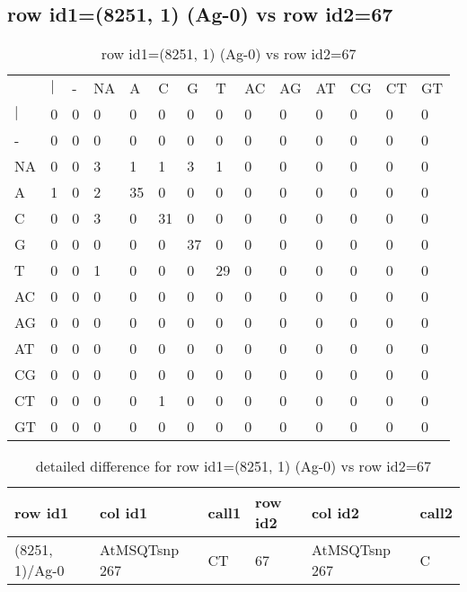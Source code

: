 \subsection{row id1=(8251, 1) (Ag-0) vs row id2=67}
\begin{center}
\begin{longtable}{|l|l|l|l|l|l|l|l|l|l|l|l|l|l|}
\caption{row id1=(8251, 1) (Ag-0) vs row id2=67} \label{table_dm190}\\
\hline
\\
\hline
&$|$&-&NA&A&C&G&T&AC&AG&AT&CG&CT&GT\\
$|$&0&0&0&0&0&0&0&0&0&0&0&0&0\\
-&0&0&0&0&0&0&0&0&0&0&0&0&0\\
NA&0&0&3&1&1&3&1&0&0&0&0&0&0\\
A&1&0&2&35&0&0&0&0&0&0&0&0&0\\
C&0&0&3&0&31&0&0&0&0&0&0&0&0\\
G&0&0&0&0&0&37&0&0&0&0&0&0&0\\
T&0&0&1&0&0&0&29&0&0&0&0&0&0\\
AC&0&0&0&0&0&0&0&0&0&0&0&0&0\\
AG&0&0&0&0&0&0&0&0&0&0&0&0&0\\
AT&0&0&0&0&0&0&0&0&0&0&0&0&0\\
CG&0&0&0&0&0&0&0&0&0&0&0&0&0\\
CT&0&0&0&0&1&0&0&0&0&0&0&0&0\\
GT&0&0&0&0&0&0&0&0&0&0&0&0&0\\
\hline
\end{longtable}
\end{center}

\begin{center}
\begin{longtable}{|l|l|l|l|l|l|}
\caption{detailed difference for row id1=(8251, 1) (Ag-0) vs row id2=67} \label{table_dm191}\\
\hline
row id1&col id1&call1&row id2&col id2&call2\\
\hline
(8251, 1)/Ag-0&AtMSQTsnp 267&CT&67&AtMSQTsnp 267&C\\
\hline
\end{longtable}
\end{center}

